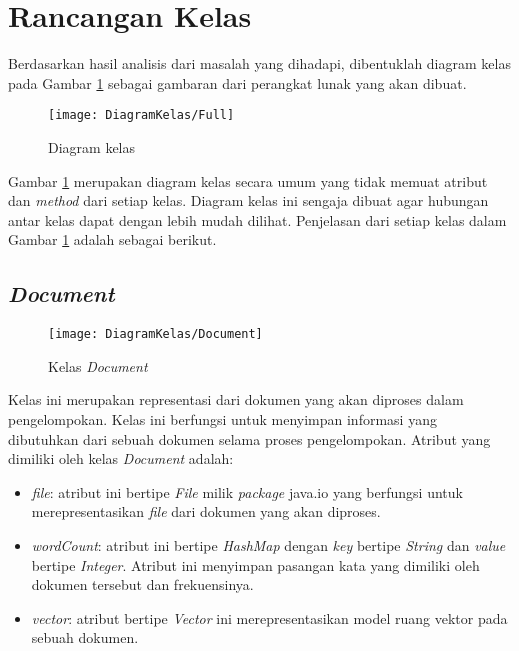 \newpage
\section{Rancangan Kelas}
Berdasarkan hasil analisis dari masalah yang dihadapi, dibentuklah diagram kelas pada Gambar \ref{fig:diagramkelas} sebagai gambaran dari perangkat lunak yang akan dibuat.

\begin{figure}[H]
	\begin{center}
		\texttt{[image: DiagramKelas/Full]}
		\caption{Diagram kelas}
		\label{fig:diagramkelas}
	\end{center}
\end{figure}

Gambar \ref{fig:diagramkelas} merupakan diagram kelas secara umum yang tidak memuat atribut dan \textit{method} dari setiap kelas. Diagram kelas ini sengaja dibuat agar hubungan antar kelas dapat dengan lebih mudah dilihat. Penjelasan dari setiap kelas dalam Gambar \ref{fig:diagramkelas} adalah sebagai berikut.

\subsection{\textit{Document}}

\begin{figure}[H]
	\begin{center}
		\texttt{[image: DiagramKelas/Document]}
		\caption{Kelas \textit{Document}}
		\label{fig:kelasDocument}
	\end{center}
\end{figure}

Kelas ini merupakan representasi dari dokumen yang akan diproses dalam pengelompokan. Kelas ini berfungsi untuk menyimpan informasi yang dibutuhkan dari sebuah dokumen selama proses pengelompokan. Atribut yang dimiliki oleh kelas \textit{Document} adalah:

\begin{itemize}
	\item \textit{file}: atribut ini bertipe \textit{File} milik \textit{package} java.io yang berfungsi untuk merepresentasikan \textit{file} dari dokumen yang akan diproses.
	\item \textit{wordCount}: atribut ini bertipe \textit{HashMap} dengan \textit{key} bertipe \textit{String} dan \textit{value} bertipe \textit{Integer}. Atribut ini menyimpan pasangan kata yang dimiliki oleh dokumen tersebut dan frekuensinya.
	\item \textit{vector}: atribut bertipe \textit{Vector} ini merepresentasikan model ruang vektor pada sebuah dokumen.
\end{itemize}

